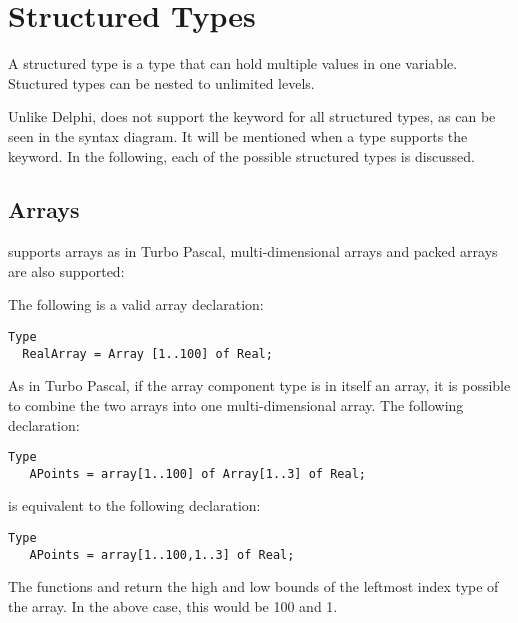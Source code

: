 \documentclass{report}
\begin{document}
\section{Structured Types}
A structured type is a type that can hold multiple values in one variable.
Stuctured types can be nested to unlimited levels.

Unlike Delphi, \fpc does not support the keyword  for all
structured types, as can be seen in the syntax diagram. It will be mentioned
when a type supports the  keyword.
In the following, each of the possible structured types is discussed.
\subsection{Arrays}
\fpc supports arrays as in Turbo Pascal, multi-dimensional arrays
and packed arrays are also supported:

The following is a valid array declaration:
\begin{verbatim}
Type
  RealArray = Array [1..100] of Real;
\end{verbatim}
As in Turbo Pascal, if the array component type is in itself an array, it is
possible to combine the two arrays into one multi-dimensional array. The
following declaration:
\begin{verbatim}
Type
   APoints = array[1..100] of Array[1..3] of Real;
\end{verbatim}
is equivalent to the following declaration:
\begin{verbatim}
Type
   APoints = array[1..100,1..3] of Real;
\end{verbatim}
The functions  and  return the high and low bounds of
the leftmost index type of the array. In the above case, this would be 100
and 1.
\end{document}
